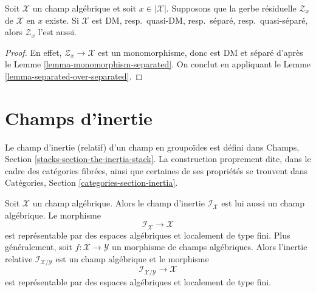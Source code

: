\begin{lemma}
\label{lemma-separation-properties-residual-gerbe}
Soit $\mathcal{X}$ un champ algébrique et soit $x \in |\mathcal{X}|$.
Supposons que la gerbe résiduelle $\mathcal{Z}_x$ de $\mathcal{X}$ en $x$
existe. Si $\mathcal{X}$ est DM, resp.\ quasi-DM, resp.\ séparé, resp.\
quasi-séparé, alors $\mathcal{Z}_x$ l'est aussi.
\end{lemma}

\begin{proof}
En effet, $\mathcal{Z}_x \to \mathcal{X}$ est un monomorphisme, donc est
DM et séparé d'après le Lemme \ref{lemma-monomorphism-separated}.
On conclut en appliquant le Lemme \ref{lemma-separated-over-separated}.
\end{proof}


















\section{Champs d'inertie}
\label{section-inertia}

\noindent
Le champ d'inertie (relatif) d'un champ en groupoïdes est défini dans
Champs, Section \ref{stacks-section-the-inertia-stack}.
La construction proprement dite, dans le cadre des catégories fibrées, ainsi
que certaines de ses propriétés se trouvent dans Catégories, Section
\ref{categories-section-inertia}.

\begin{lemma}
\label{lemma-inertia}
Soit $\mathcal{X}$ un champ algébrique. Alors le champ d'inertie
$\mathcal{I}_\mathcal{X}$ est lui aussi un champ algébrique. Le morphisme
$$
\mathcal{I}_\mathcal{X} \longrightarrow \mathcal{X}
$$
est représentable par des espaces algébriques et localement de type fini.
Plus généralement, soit $f : \mathcal{X} \to \mathcal{Y}$ un morphisme de
champs algébriques. Alors l'inertie relative
$\mathcal{I}_{\mathcal{X}/\mathcal{Y}}$ est un champ algébrique et le
morphisme
$$
\mathcal{I}_{\mathcal{X}/\mathcal{Y}} \longrightarrow \mathcal{X}
$$
est représentable par des espaces algébriques et localement de type fini.
\end{lemma}

